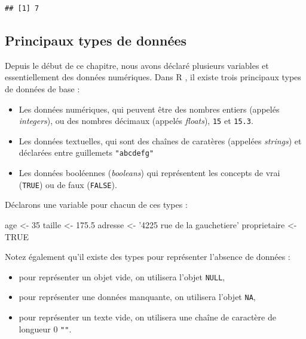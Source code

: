 \documentclass[
  11pt,
  french,
]{book}
\makeatletter
\newenvironment{Shaded}{\begin{snugshade}}{\end{snugshade}}
\newcommand{\DecValTok}[1]{\textcolor[rgb]{0.00,0.00,0.81}{#1}}
\newcommand{\FloatTok}[1]{\textcolor[rgb]{0.00,0.00,0.81}{#1}}
\newcommand{\NormalTok}[1]{#1}
\newcommand{\OtherTok}[1]{\textcolor[rgb]{0.56,0.35,0.01}{#1}}
\newcommand{\StringTok}[1]{\textcolor[rgb]{0.31,0.60,0.02}{#1}}
\providecommand{\tightlist}{%
  \setlength{\itemsep}{0pt}\setlength{\parskip}{0pt}}
\newenvironment{kframe}{%
\medskip{}
\setlength{\fboxsep}{.8em}
 \def\at@end@of@kframe{}%
 \ifinner\ifhmode%
  \def\at@end@of@kframe{\end{minipage}}%
  \begin{minipage}{\columnwidth}%
 \fi\fi%
 \def\FrameCommand##1{\hskip\@totalleftmargin \hskip-\fboxsep
 \colorbox{shadecolor}{##1}\hskip-\fboxsep
     \hskip-\linewidth \hskip-\@totalleftmargin \hskip\columnwidth}%
 \MakeFramed {\advance\hsize-\width
   \@totalleftmargin\z@ \linewidth\hsize
   \@setminipage}}%
 {\par\unskip\endMakeFramed%
 \at@end@of@kframe}
\renewenvironment{Shaded}{\begin{kframe}}{\end{kframe}}
\makeatother
\begin{document}
\begin{verbatim}
## [1] 7
\end{verbatim}

\hypertarget{sect0134}{%
\subsection{Principaux types de données}\label{sect0134}}

Depuis le début de ce chapitre, nous avons déclaré plusieurs variables et essentiellement des données numériques. Dans R , il existe trois principaux types de données de base :

\begin{itemize}
\tightlist
\item
  Les données numériques, qui peuvent être des nombres entiers (appelés \emph{integers}), ou des nombres décimaux (appelés \emph{floats}), \texttt{15} et \texttt{15.3}.
\item
  Les données textuelles, qui sont des chaînes de caratères (appelées \emph{strings}) et déclarées entre guillemets \texttt{"abcdefg"}
\item
  Les données booléennes (\emph{booleans}) qui représentent les concepts de vrai (\texttt{TRUE}) ou de faux (\texttt{FALSE}).
\end{itemize}

Déclarons une variable pour chacun de ces types :

\begin{Shaded}
\begin{Highlighting}[]
\NormalTok{age <-}\StringTok{ }\DecValTok{35}
\NormalTok{taille <-}\StringTok{ }\FloatTok{175.5}
\NormalTok{adresse <-}\StringTok{ '4225 rue de la gauchetiere'}
\NormalTok{proprietaire <-}\StringTok{ }\OtherTok{TRUE}
\end{Highlighting}
\end{Shaded}

Notez également qu'il existe des types pour représenter l'absence de données :

\begin{itemize}
\tightlist
\item
  pour représenter un objet vide, on utilisera l'objet \texttt{NULL},
\item
  pour représenter une données manquante, on utilisera l'objet \texttt{NA},
\item
  pour représenter un texte vide, on utilisera une chaîne de caractère de longueur 0 \texttt{""}.
\end{itemize}
\end{document}
